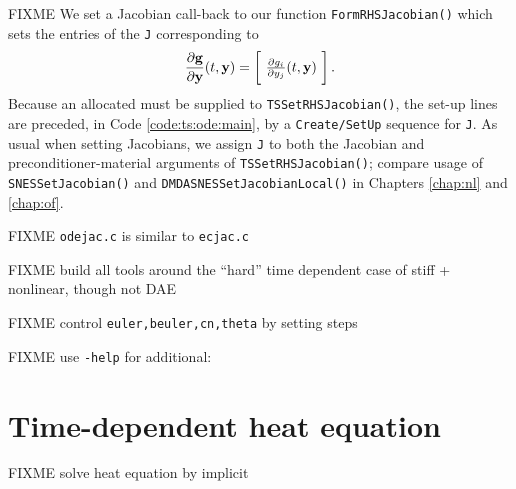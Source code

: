 FIXME We set a Jacobian call-back to our function \texttt{FormRHSJacobian()} which sets the entries of the \pMat \texttt{J} corresponding to
    $$\frac{\partial \mathbf{g}}{\partial \mathbf{y}}(t,\mathbf{y}) = \begin{bmatrix}\phantom{\bigg|} \frac{\partial g_i}{\partial y_j}(t,\mathbf{y}) \phantom{\bigg|}\end{bmatrix}.$$
Because an allocated \pMat must be supplied to \texttt{TSSetRHSJacobian()}, the \pTS set-up lines are preceded, in Code \ref{code:ts:ode:main}, by a \texttt{Create/SetUp} sequence for \pMat \texttt{J}.  As usual when setting Jacobians, we assign \texttt{J} to both the Jacobian and preconditioner-material arguments of \texttt{TSSetRHSJacobian()}; compare usage of \texttt{SNESSetJacobian()} and \texttt{DMDASNESSetJacobianLocal()} in Chapters \ref{chap:nl} and \ref{chap:of}.



FIXME \texttt{odejac.c} is similar to \texttt{ecjac.c}

FIXME build all tools around the ``hard'' time dependent case of stiff + nonlinear, though not DAE

FIXME control \texttt{euler,beuler,cn,theta} by setting steps

FIXME use \texttt{-help} for additional:




\section{Time-dependent heat equation}

FIXME solve heat equation by implicit


